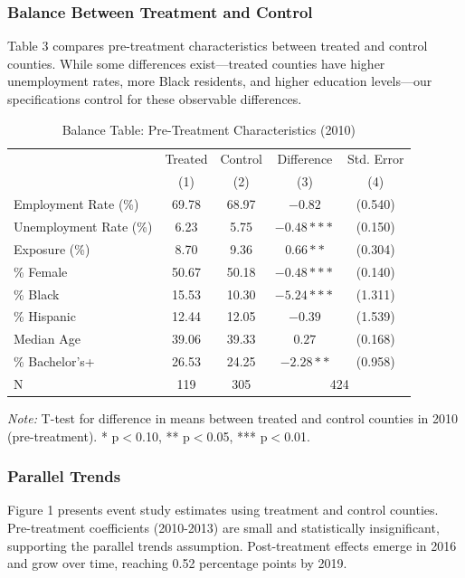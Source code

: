 \documentclass[12pt]{article}
\begin{document}
\subsubsection{Balance Between Treatment and Control}

Table 3 compares pre-treatment characteristics between treated and control counties. While some differences exist—treated counties have higher unemployment rates, more Black residents, and higher education levels—our specifications control for these observable differences.

\begin{table}[H]
\centering
\caption{Balance Table: Pre-Treatment Characteristics (2010)}
\label{tab:balance}
\small
\begin{tabular}{lcccc}
\toprule
 & Treated & Control & Difference & Std. Error \\
 & (1) & (2) & (3) & (4) \\
\midrule
Employment Rate (\%) & 69.78 & 68.97 & $-0.82$ & (0.540) \\
Unemployment Rate (\%) & 6.23 & 5.75 & $-0.48***$ & (0.150) \\
Exposure (\%) & 8.70 & 9.36 & $0.66**$ & (0.304) \\
\% Female & 50.67 & 50.18 & $-0.48***$ & (0.140) \\
\% Black & 15.53 & 10.30 & $-5.24***$ & (1.311) \\
\% Hispanic & 12.44 & 12.05 & $-0.39$ & (1.539) \\
Median Age & 39.06 & 39.33 & $0.27$ & (0.168) \\
\% Bachelor's+ & 26.53 & 24.25 & $-2.28**$ & (0.958) \\
\midrule
N & 119 & 305 & \multicolumn{2}{c}{424} \\
\bottomrule
\end{tabular}
\captionsetup{justification=raggedright,singlelinecheck=false}
\vspace{0.2cm}
\textit{Note:} T-test for difference in means between treated and control counties in 2010 (pre-treatment). * p$<$0.10, ** p$<$0.05, *** p$<$0.01.
\end{table}

\subsubsection{Parallel Trends}

Figure 1 presents event study estimates using treatment and control counties. Pre-treatment coefficients (2010-2013) are small and statistically insignificant, supporting the parallel trends assumption. Post-treatment effects emerge in 2016 and grow over time, reaching 0.52 percentage points by 2019.
\end{document}
